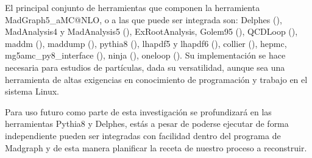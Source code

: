 El principal conjunto de herramientas que componen la herramienta MadGraph5\_aMC@NLO, o a las que puede ser integrada son: Delphes (\cite{de_favereau_delphes_2014-1}), MadAnalysis4 y MadAnalysis5 (\cite{conte_madanalysis_2013}), ExRootAnalysis, Golem95 (\cite{binoth_precise_2008}), QCDLoop (\cite{ellis_scalar_2008}), maddm (\cite{wang_novel_2018}), maddump (\cite{buonocore_event_2019}), pythia8 (\cite{sjostrand_introduction_2015-1}), lhapdf5 y lhapdf6 (\cite{buckley_lhapdf6_2015}), collier (\cite{denner_collier_2017}), hepmc, mg5amc\_py8\_interface (\cite{sjostrand_introduction_2015-1}), ninja (\cite{hirschi_tensor_2016, peraro_ninja_2014, mastrolia_integrand_2012}), oneloop (\cite{van_hameren_oneloop_2011}). Su implementación se hace necesaria para estudios de partículas, dada su versatilidad, aunque sea una herramienta de altas exigencias en conocimiento de programación y trabajo en el sistema Linux. 

Para uso futuro como parte de esta investigación se profundizará en las herramientas Pythia8 y Delphes, estás a pesar de poderse ejecutar de forma independiente pueden ser integradas con facilidad dentro del programa de Madgraph y de esta manera planificar la receta de nuestro proceso a reconstruir.
